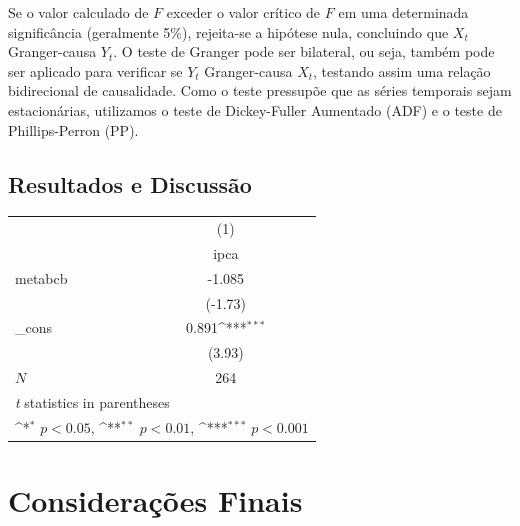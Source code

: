 \documentclass[12pt,oneside,a4paper,chapter=TITLE,english,brazil,sumario=abnt-6027-2012]{abntex2}
\begin{document}
Se o valor calculado de \( F \) exceder o valor crítico de \( F \) em uma determinada significância (geralmente 5\%), rejeita-se a hipótese nula, concluindo que \( X_t \) Granger-causa \( Y_t \). O teste de Granger pode ser bilateral, ou seja, também pode ser aplicado para verificar se \( Y_t \) Granger-causa \( X_t \), testando assim uma relação bidirecional de causalidade. Como o teste pressupõe que as séries temporais sejam estacionárias, utilizamos o teste de Dickey-Fuller Aumentado (ADF) e o teste de Phillips-Perron (PP).

\section{Resultados e Discussão}


\begin{table}[H]
	\centering
	\def\sym#1{\ifmmode^{#1}\else\(^{#1}\)\fi}
	\begin{tabular}{l*{1}{c}}
		\hline\hline
		        & \multicolumn{1}{c}{(1)}                                                                \\
		        & \multicolumn{1}{c}{ipca}                                                               \\
		\hline
		metabcb & -1.085                                                                                 \\
		        & (-1.73)                                                                                \\
		[1em]
		\_cons  & 0.891\sym{***}                                                                         \\
		        & (3.93)                                                                                 \\
		\hline
		\(N\)   & 264                                                                                    \\
		\hline\hline
		\multicolumn{2}{l}{\footnotesize \textit{t} statistics in parentheses}                           \\
		\multicolumn{2}{l}{\footnotesize \sym{*} \(p<0.05\), \sym{**} \(p<0.01\), \sym{***} \(p<0.001\)} \\
	\end{tabular}
\end{table}

\chapter{Considerações Finais}
\end{document}
